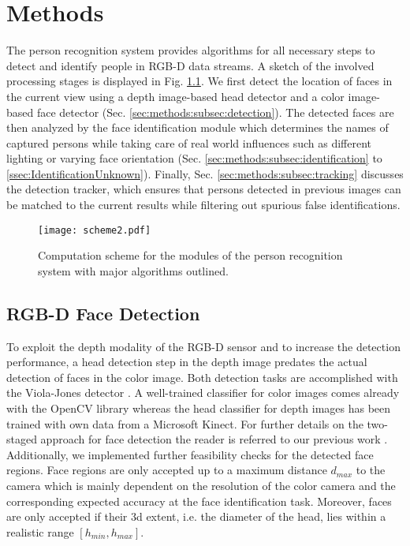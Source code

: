 \chapter{Methods}
\label{chap:methods}
The person recognition system provides algorithms for all necessary steps to detect and identify people in RGB-D data streams.
A sketch of the involved processing stages is displayed in Fig. \ref{fig:scheme}.
We first detect the location of faces in the current view using a depth image-based head detector and a color image-based face detector (Sec. \ref{sec:methods:subsec:detection}).
The detected faces are then analyzed by the face identification module which determines the names of captured persons while taking care of real world influences such as different lighting or varying face orientation (Sec. \ref{sec:methods:subsec:identification} to \ref{ssec:IdentificationUnknown}).
Finally, Sec. \ref{sec:methods:subsec:tracking} discusses the detection tracker, which ensures that persons detected in previous images can be matched to the current results while filtering out spurious false identifications.

\begin{figure}[tb]
	\begin{center}
		\texttt{[image: scheme2.pdf]}
	\end{center}
	\caption{Computation scheme for the modules of the person recognition system with major algorithms outlined.}
	\label{fig:scheme}
\end{figure}

\section{RGB-D Face Detection}
\label{chap:methods:sec:detection}
To exploit the depth modality of the RGB-D sensor and to increase the detection performance, a head detection step in the depth image predates the actual detection of faces in the color image.
Both detection tasks are accomplished with the Viola-Jones detector \cite{Viola01}. %
A well-trained classifier for color images comes already with the OpenCV library \cite{bradski2008} whereas the head classifier for depth images has been trained with own data from a Microsoft Kinect. 
For further details on the two-staged approach for face detection the reader is referred to our previous work \cite{Fischer2010}.
Additionally, we implemented further feasibility checks for the detected face regions. 
Face regions are only accepted up to a maximum distance $d_{max}$ to the camera which is mainly dependent on the resolution of the color camera and the corresponding expected accuracy at the face identification task.
Moreover, faces are only accepted if their 3d extent, i.e. the diameter of the head, lies within a realistic range $[h_{min}, h_{max}]$.

